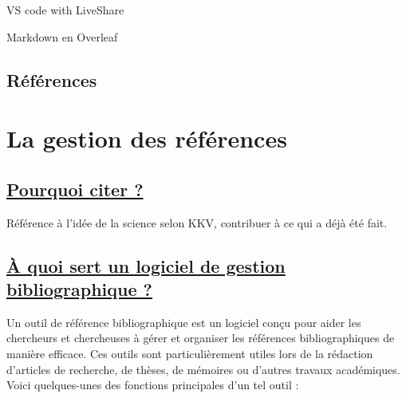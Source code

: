 \documentclass[
  letterpaper,
]{scrbook}
\begin{document}
VS code with LiveShare

Markdown en Overleaf

\hypertarget{ruxe9fuxe9rences}{%
\section{Références}\label{ruxe9fuxe9rences}}


\hypertarget{sec-chap6}{%
\chapter{La gestion des références}\label{sec-chap6}}

\hypertarget{pourquoi-citer}{%
\section{\texorpdfstring{\ul{Pourquoi citer
?}}{Pourquoi citer ?}}\label{pourquoi-citer}}

Référence à l'idée de la science selon KKV, contribuer à ce qui a déjà
été fait.

\hypertarget{uxe0-quoi-sert-un-logiciel-de-gestion-bibliographique}{%
\section{\texorpdfstring{\ul{À quoi sert un logiciel de gestion
bibliographique
?}}{À quoi sert un logiciel de gestion bibliographique ?}}\label{uxe0-quoi-sert-un-logiciel-de-gestion-bibliographique}}

Un outil de référence bibliographique est un logiciel conçu pour aider
les chercheurs et chercheuses à gérer et organiser les références
bibliographiques de manière efficace. Ces outils sont particulièrement
utiles lors de la rédaction d'articles de recherche, de thèses, de
mémoires ou d'autres travaux académiques. Voici quelques-unes des
fonctions principales d'un tel outil :
\end{document}
